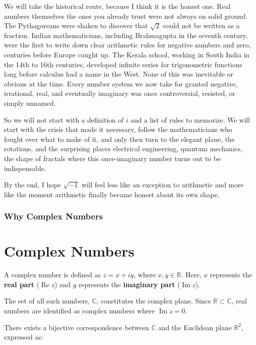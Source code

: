 \documentclass[
]{book}
\theoremstyle{definition}
\theoremstyle{definition}
\theoremstyle{definition}
\theoremstyle{definition}
\theoremstyle{remark}
\begin{document}
We will take the historical route, because I think it is the honest one. Real numbers themselves the ones you already trust were not always on solid ground. The Pythagoreans were shaken to discover that \(\sqrt{2}\) could not be written as a fraction. Indian mathematicians, including Brahmagupta in the seventh century, were the first to write down clear arithmetic rules for negative numbers and zero, centuries before Europe caught up. The Kerala school, working in South India in the 14th to 16th centuries, developed infinite series for trigonometric functions long before calculus had a name in the West. None of this was inevitable or obvious at the time. Every number system we now take for granted negative, irrational, real, and eventually imaginary was once controversial, resisted, or simply unnamed.

So we will not start with a definition of \(i\) and a list of rules to memorize. We will start with the crisis that made it necessary, follow the mathematicians who fought over what to make of it, and only then turn to the elegant plane, the rotations, and the surprising places electrical engineering, quantum mechanics, the shape of fractals where this once-imaginary number turns out to be indispensable.

By the end, I hope \(\sqrt{-1}\) will feel less like an exception to arithmetic and more like the moment arithmetic finally became honest about its own shape.

\subsection{Why Complex Numbers}\label{why-complex-numbers}

\chapter{Complex Numbers}\label{complex-numbers}

A complex number is defined as \(z = x + iy\), where \(x, y \in \mathbb{R}\). Here, \(x\) represents the \textbf{real part} (\(\operatorname{Re}z\)) and \(y\) represents the \textbf{imaginary part} (\(\operatorname{Im}z\)).

The set of all such numbers, \(\mathbb{C}\), constitutes the complex plane. Since \(\mathbb{R} \subset \mathbb{C}\), real numbers are identified as complex numbers where \(\operatorname{Im}z = 0\).

There exists a bijective correspondence between \(\mathbb{C}\) and the Euclidean plane \(\mathbb{R}^2\), expressed as:
\end{document}
